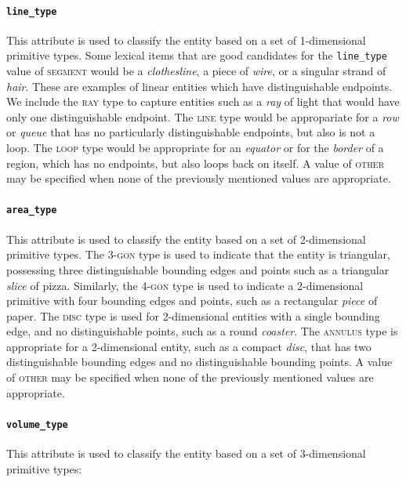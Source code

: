 \documentclass[11pt]{article}
\begin{document}
\paragraph{\texttt{line\_type}} %
\label{par:line_type}
This attribute is used to classify the entity based on a set of 1-dimensional primitive types. Some lexical items that are good candidates for the \texttt{line\_type} value of \textsc{segment} would be a \emph{clothesline}, a piece of \emph{wire}, or a singular strand of \emph{hair}. These are examples of linear entities which have distinguishable endpoints. We include the \textsc{ray} type to capture entities such as a \emph{ray} of light that would have only one distinguishable endpoint. The \textsc{line} type would be appropariate for a \emph{row} or \emph{queue} that has no particularly distinguishable endpoints, but also is not a loop. The \textsc{loop} type would be appropriate for an \emph{equator} or for the \emph{border} of a region, which has no endpoints, but also loops back on itself. A value of \textsc{other} may be specified when none of the previously mentioned values are appropriate.

\paragraph{\texttt{area\_type}} %
\label{par:area_type}
This attribute is used to classify the entity based on a set of 2-dimensional primitive types. The \textsc{3-gon} type is used to indicate that the entity is triangular, possessing three distinguishable bounding edges and points such as a triangular \emph{slice} of pizza. Similarly, the \textsc{4-gon} type is used to indicate a 2-dimensional primitive with four bounding edges and points, such as a rectangular \emph{piece} of paper. The \textsc{disc} type is used for 2-dimensional entities with a single bounding edge, and no distinguishable points, such as a round \emph{coaster}. The \textsc{annulus} type is appropriate for a 2-dimensional entity, such as a compact \emph{disc}, that has two distinguishable bounding edges and no distinguishable bounding points. A value of \textsc{other} may be specified when none of the previously mentioned values are appropriate.

\paragraph{\texttt{volume\_type}} %
\label{par:volume_type}
This attribute is used to classify the entity based on a set of 3-dimensional primitive types:
\end{document}
